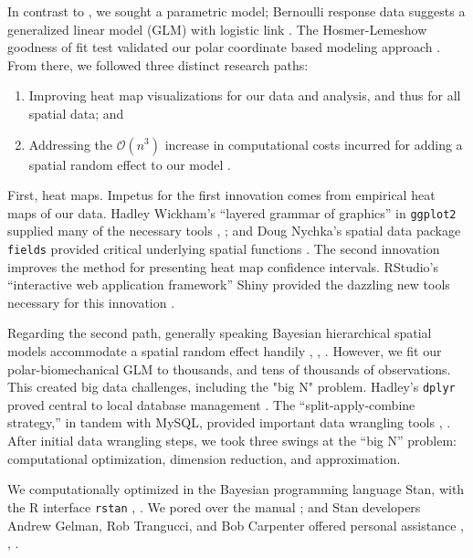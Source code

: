 In contrast to \cite{Cross2015}, we sought a parametric model; Bernoulli response data suggests a generalized linear model (GLM) with logistic link \citep{Myers2012}. The Hosmer-Lemeshow goodness of fit test validated our polar coordinate based modeling approach \cite{Hosmer2013}. From there, we followed three distinct research paths:
\begin{enumerate}
\item Improving heat map visualizations for our data and analysis, and thus for all spatial data; and 
\item Addressing the $\mathcal{O}(n^{3})$ increase in computational costs incurred for adding a spatial random effect to our model \citep{Finley2009}.
\end{enumerate}
First, heat maps. Impetus for the first innovation comes from empirical heat maps of our data. Hadley Wickham's ``layered grammar of graphics'' in \verb|ggplot2| supplied many of the necessary tools \citep{Wickham2009}, \citep{Wickham2010}; and Doug Nychka's spatial data package \verb|fields| provided critical underlying spatial functions \citep{Nychka}. The second innovation improves the method for presenting heat map confidence intervals. RStudio's ``interactive web application framework'' Shiny provided the dazzling new tools necessary for this innovation \citep{Shiny}.


Regarding the second path, generally speaking Bayesian hierarchical spatial models accommodate a spatial random effect handily \citep{Gelman2014}, \citep{Banerjee2014}, \citep{Oliver2005}. However, we fit our polar-biomechanical GLM to thousands, and tens of thousands of observations. This created big data challenges, including the "big N" problem. Hadley's \verb|dplyr| proved central to local database management \citep{Wickham2016}. The ``split-apply-combine strategy,'' in tandem with MySQL, provided important data wrangling tools \citep{Wickham2016}, \citep{Tahaghoghi2006}. After initial data wrangling steps, we took three swings at the ``big N'' problem: computational optimization, dimension reduction, and approximation.

We computationally optimized in the Bayesian programming language Stan, with the R interface \verb|rstan| \citep{rstan}, \citep{Gelman2015}. We pored over the manual \citep{STANtheMan}; and Stan developers Andrew Gelman, Rob Trangucci, and Bob Carpenter offered personal assistance \citep{Gelman}, \citep{Trangucci}, \citep{Carpenter}.

